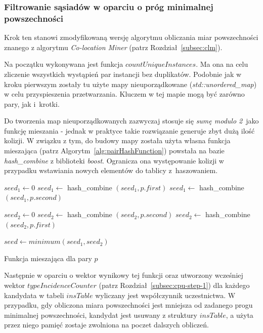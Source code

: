 \documentclass[12pt]{article}
\begin{document}
\subsubsection{Filtrowanie sąsiadów w oparciu o próg minimalnej powszechności}

Krok ten stanowi zmodyfikowaną wersję algorytmu obliczania miar powszechności znanego z algorytmu \textit{Co-location Miner} (patrz Rozdział~\ref{subsec:clm}).

Na początku wykonywana jest funkcja $ countUniqueInstances$. Ma ona na celu zliczenie wszystkich wystąpień par instancji bez duplikatów. Podobnie jak w kroku pierwszym zostały tu użyte mapy nieuporządkowane (\textit{std::unordered\_map}) w celu przyspieszenia przetwarzania.
Kluczem w tej mapie mogą być zarówno pary, jak i~krotki.

Do tworzenia map nieuporządkowanych zazwyczaj stosuje się \textit{sumę modulo 2}~jako funkcję mieszania - jednak w praktyce takie rozwiązanie generuje zbyt dużą ilość kolizji. W związku z tym, do budowy mapy została użyta własna funkcja mieszająca (patrz Algorytm~\ref{alg:pairHashFunction}) powstała na bazie \textit{hash\_combine} z biblioteki \textit{boost}. Ogranicza ona występowanie kolizji w przypadku wstawiania nowych elementów do tablicy z~haszowaniem. 

\begin{algorithm}
$ seed_1 \leftarrow 0 $\;
$ seed_1 \leftarrow $ hash\_combine $(seed_1, p.first) $\;
$ seed_1 \leftarrow $ hash\_combine $(seed_1, p.second) $\;

$ seed_2 \leftarrow 0 $\;
$ seed_2 \leftarrow $ hash\_combine $(seed_2, p.second) $\;
$ seed_2 \leftarrow $ hash\_combine $(seed_2, p.first) $\;

$ seed \leftarrow minimum(seed_1, seed_2) $\;

\caption{Funkcja mieszająca dla pary $p$}
\label{alg:pairHashFunction}
\end{algorithm}

Następnie w oparciu o wektor wynikowy tej funkcji oraz utworzony wcześniej wektor $ typeIncidenceCounter$ (patrz Rozdział~\ref{subsec:cpu-step-1}) dla każdego kandydata w tabeli $ insTable $ wyliczany jest współczynnik uczestnictwa. W przypadku, gdy obliczona miara powszechności jest mniejsza od zadanego progu minimalnej powszechności, kandydat jest usuwany z struktury $ insTable $, a użyta przez niego pamięć zostaje zwolniona na poczet dalszych obliczeń.
\end{document}
